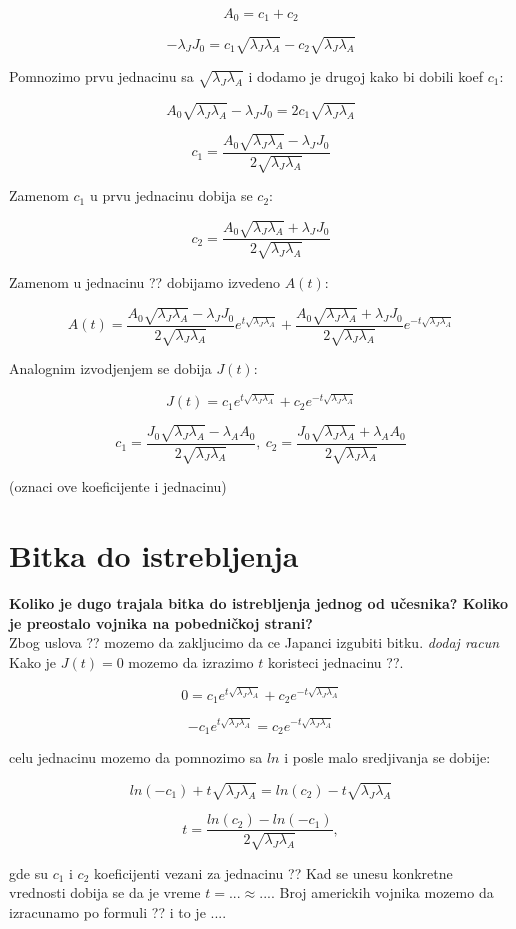 \documentclass{article}
\newcommand{\laj}{\sqrt{\lambda_J\lambda_A}}
\begin{document}
\[
  A_0 = c_1 + c_2
\]

\[
  -\lambda_{J}J_0 = c_1 \laj - c_2 \laj
\]

Pomnozimo prvu jednacinu sa \( \laj \) i dodamo je
drugoj kako bi dobili koef \( c_1 \):

\[
  A_0 \laj - \lambda_{J}J_0 = 2 c_1 \laj
\]

\[
  c_1 = \frac{A_0 \laj - \lambda_J J_0}{2\laj }
\]

Zamenom \(c_1\) u prvu jednacinu dobija se \(c_2\):

\[
  c_2 = \frac{A_0 \laj + \lambda_J J_0}{2\laj }
\]

Zamenom u jednacinu ?? dobijamo izvedeno \(A(t)\):

\[
  A(t) = \frac{A_0 \laj - \lambda_J J_0}{2 \laj } e^{t \laj } + \frac{A_0 \laj +
\lambda_J J_0}{2 \laj } e^{-t \laj}
\]

Analognim izvodjenjem se dobija \(J(t)\):

\[
  J(t) = c_1 e^{t \laj} + c_2 e^{-t \laj}
\]

\[
 c_1 = \frac{J_0 \laj- \lambda_A A_0}{2\laj},\ 
 c_2 = \frac{J_0 \laj+ \lambda_A A_0}{2 \laj}
\]

(oznaci ove koeficijente i jednacinu)

\section*{Bitka do istrebljenja}

\textbf{Koliko je dugo trajala bitka do istrebljenja jednog od
učesnika? Koliko je preostalo vojnika na pobedničkoj
strani?} \\

Zbog uslova ?? mozemo da zakljucimo da ce Japanci izgubiti bitku.
\emph{dodaj racun} \\
Kako je \(J(t) = 0\) mozemo da izrazimo \(t\) koristeci
jednacinu ??.

\[
  0 = c_1 e^{t \laj} + c_2 e^{-t \laj}
\]

\[
  -c_1 e^{t \laj} = c_2 e^{-t \laj}
\]

celu jednacinu mozemo da pomnozimo sa \(ln\) i posle malo sredjivanja se
dobije:

\[
  ln(-c_1) + t\laj= ln(c_2) - t\laj
\]

\[
  t = \frac{ln(c_2) - ln(-c_1)}{2\laj}, 
\]

gde su \(c_1\) i \(c_2\) koeficijenti vezani za jednacinu ?? Kad se
unesu konkretne vrednosti dobija se da je vreme \(t = ... \approx ...\).
Broj americkih vojnika mozemo da izracunamo po formuli ?? i to je
\(...\).
\end{document}
